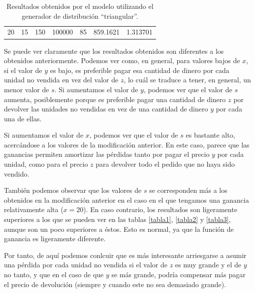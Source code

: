 \documentclass[11pt,a4paper]{report}
\begin{document}
\begin{table}[H]
{\begin{tabular}{c|c|c|c|c|c|c}
20                                                                                   & 15                                                                                     & 150                                                                        & 100000                                                                    & 85                                                                                        & 859.1621                                                                  & 1.313701             
\end{tabular}%
}
\caption{Resultados obtenidos por el modelo utilizando el generador de distribución ``triangular''.}
\label{tabla9}
\end{table}

Se puede ver claramente que los resultados obtenidos son diferentes a los obtenidos anteriormente. Podemos ver como, en general,
para valores bajos de $x$, si el valor de $y$ es bajo, es preferible pagar esa cantidad de dinero por cada unidad no vendida
en vez del valor de $z$, lo cuál se traduce a tener, en general, un menor valor de $s$. Si aumentamos el valor de $y$, podemos
ver que el valor de $s$ aumenta, posiblemente porque es preferible pagar una cantidad de dinero $z$ por devolver las unidades
no vendidas en vez de una cantidad de dinero $y$ por cada una de ellas.

Si aumentamos el valor de $x$, podemos ver que el valor de $s$ es bastante alto, acercándose a los valores de la modificación
anterior. En este caso, parece que las ganancias permiten amortizar las pérdidas tanto por pagar el precio $y$ por cada unidad,
como para el precio $z$ para devolver todo el pedido que no haya sido vendido.

También podemos observar que los valores de $s$ se corresponden más a los obtenidos en la modificación anterior en el caso en
el que tengamos una ganancia relativamente alta ($x = 20$). En caso contrario, los resultados son ligeramente superiores a los
que se pueden ver en las tablas \ref{tabla1}, \ref{tabla2} y \ref{tabla3}, aunque son un poco superiores a éstos. Esto es normal,
ya que la función de ganancia es ligeramente diferente.

Por tanto, de aquí podemos conlcuir que es más interesante arriesgarse a asumir una pérdida por cada unidad no vendida si el valor
de $z$ es muy grande y el de $y$ no tanto, y que en el caso de que $y$ se más grande, podría compensar más pagar el precio
de devolución (siempre y cuando este no sea demasiado grande).
\end{document}
